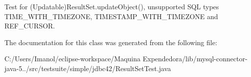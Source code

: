 Test for (Updatable)Result\+Set.\+update\+Object(), unsupported S\+QL types T\+I\+M\+E\+\_\+\+W\+I\+T\+H\+\_\+\+T\+I\+M\+E\+Z\+O\+NE, T\+I\+M\+E\+S\+T\+A\+M\+P\+\_\+\+W\+I\+T\+H\+\_\+\+T\+I\+M\+E\+Z\+O\+NE and R\+E\+F\+\_\+\+C\+U\+R\+S\+OR. 

The documentation for this class was generated from the following file\+:\begin{DoxyCompactItemize}
\item 
C\+:/\+Users/\+Imanol/eclipse-\/workspace/\+Maquina Expendedora/lib/mysql-\/connector-\/java-\/5../src/testsuite/simple/jdbc42/Result\+Set\+Test.\+java\end{DoxyCompactItemize}
